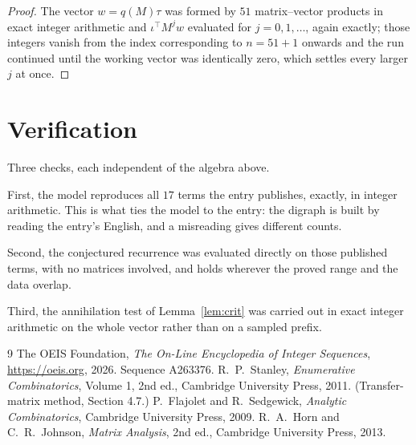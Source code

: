 \documentclass[11pt,a4paper]{article}
\theoremstyle{plain}
\theoremstyle{definition}
\begin{document}
\begin{proof}
The vector $w=q(M)\tau$ was formed by $51$ matrix--vector products in exact integer
arithmetic and $\iota^{\!\top}M^{j}w$ evaluated for $j=0,1,\dots$, again exactly; those
integers vanish from the index corresponding to $n=51+1$ onwards and the run continued
until the working vector was identically zero, which settles every larger $j$ at once.
\end{proof}

\section{Verification}

Three checks, each independent of the algebra above.

First, the model reproduces all $17$ terms the entry publishes, exactly, in integer
arithmetic. This is what ties the model to the entry: the digraph is built by reading the
entry's English, and a misreading gives different counts.

Second, the conjectured recurrence was evaluated directly on those published terms, with no
matrices involved, and holds wherever the proved range and the data overlap.

Third, the annihilation test of Lemma~\ref{lem:crit} was carried out in exact integer
arithmetic on the whole vector rather than on a sampled prefix.

\begin{thebibliography}{9}
 The OEIS Foundation, \emph{The On-Line Encyclopedia of Integer
Sequences}, \url{https://oeis.org}, 2026. Sequence A263376.
 R.~P.~Stanley, \emph{Enumerative Combinatorics}, Volume 1, 2nd ed.,
Cambridge University Press, 2011. (Transfer-matrix method, Section 4.7.)
 P.~Flajolet and R.~Sedgewick, \emph{Analytic Combinatorics}, Cambridge
University Press, 2009.
 R.~A.~Horn and C.~R.~Johnson, \emph{Matrix Analysis}, 2nd ed., Cambridge
University Press, 2013.
\end{thebibliography}
\end{document}
